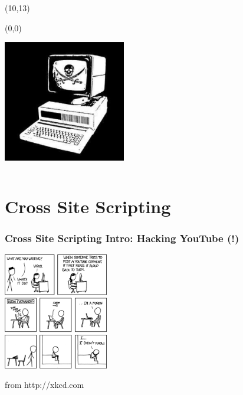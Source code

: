 \documentclass{beamer}
\begin{document}
\begin{frame}
\begin{columns}
\begin{column}{0.3\textwidth}
      \begin{textblock}{4}(10,13)
	\begin{picture}(0,0)
	  \centerline{\includegraphics[width=0.4\textwidth]{images/crack.jpg}}
	\end{picture}
      \end{textblock} 
    \end{column}
  \end{columns}
  
\end{frame}

\section{Cross Site Scripting}
\begin{frame}
\frametitle{Cross Site Scripting Intro: Hacking YouTube (!)}
      \begin{center}
	\includegraphics[width=130pt]{images/listen_to_yourself.png}
	\newline
	\begin{tiny}from http://xkcd.com \end{tiny}
      \end{center}
\end{frame}
\end{document}

